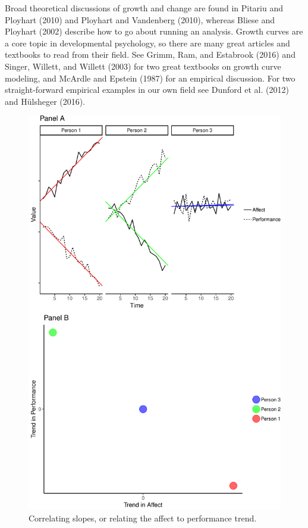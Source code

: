 \documentclass[english,,man]{apa6}
\theoremstyle{definition}
\theoremstyle{definition}
\theoremstyle{definition}
\theoremstyle{remark}
\begin{document}
Broad theoretical discussions of growth and change are found in Pitariu
and Ployhart (2010) and Ployhart and Vandenberg (2010), whereas Bliese
and Ployhart (2002) describe how to go about running an analysis. Growth
curves are a core topic in developmental psychology, so there are many
great articles and textbooks to read from their field. See Grimm, Ram,
and Estabrook (2016) and Singer, Willett, and Willett (2003) for two
great textbooks on growth curve modeling, and McArdle and Epstein (1987)
for an empirical discussion. For two straight-forward empirical examples
in our own field see Dunford et al. (2012) and Hülsheger (2016).

\begin{figure}
\centering
\includegraphics{figures/unnamed-chunk-10-1.pdf}
\caption{\label{fig:unnamed-chunk-10}Correlating slopes, or relating the
affect to performance trend.\label{trend_correlation}}
\end{figure}
\end{document}
